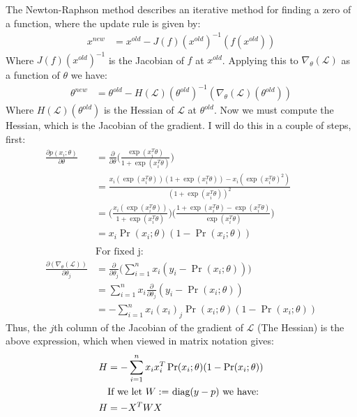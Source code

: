 \documentclass[12pt]{article}
\begin{document}
The Newton-Raphson method describes an iterative method for finding a zero
of a function, where the update rule is given by:
\begin{align*}
    x^{new} &= x^{old} - J(f)(x^{old})^{-1}(f(x^{old}))
\end{align*}
Where $J(f)(x^{old})^{-1}$ is the Jacobian of $f$ at $x^{old}$. Applying
this to $\nabla_\theta(\mathcal{L})$ as a function of $\theta$ we have:
\begin{align*}
    \theta^{new} &= \theta^{old} - H(\mathcal{L})(\theta^{old})^{-1}(\nabla_\theta(\mathcal{L})(\theta^{old}))
\end{align*}
Where $H(\mathcal{L})(\theta^{old})$ is the Hessian of $\mathcal{L}$ at $\theta^{old}$. Now we must compute the Hessian, which is the Jacobian of the gradient.
I will do this in a couple of steps, first:
\begin{align*}
    \frac{\partial p(x_i; \theta)}{\partial \theta} &= \frac{\partial}{\partial \theta}\Big(\frac{\exp(x_i^T\theta)}{1 + \exp(x_i^T\theta)}\Big) \\
    &= \frac{x_i(\exp(x_i^T\theta))(1 + \exp(x_i^T\theta)) - x_i(\exp(x_i^T\theta)^2)}{(1 + \exp(x_i^T\theta))^2} \\
    &= \Big(\frac{x_i(\exp(x_i^T\theta))}{1 + \exp(x_i^T\theta)}\Big)\Big(\frac{1 + \exp(x_i^T\theta) - \exp(x_i^T\theta)}{\exp(x_i^T\theta)} \Big) \\
    &= x_i\Pr(x_i; \theta)(1 - \Pr(x_i; \theta))
    \\ \\
    &\text{For fixed j:} \\
    \frac{\partial (\nabla_\theta(\mathcal{L}))}{\partial \theta_j} &= \frac{\partial}{\partial \theta_j}\Big(\displaystyle \sum_{i = 1}^{n} x_i(y_i - \Pr(x_i; \theta))\Big) \\
    &=\displaystyle \sum_{i = 1}^{n} x_i \frac{\partial}{\partial \theta_j}(y_i - \Pr(x_i; \theta)) \\
    &= \displaystyle -\sum_{i = 1}^{n} x_i(x_i)_j\Pr(x_i; \theta)(1 - \Pr(x_i; \theta))
\end{align*}
Thus, the $j$th column of the Jacobian of the gradient of $\mathcal{L}$ (The Hessian) is the above expression, which when viewed in matrix notation gives:
\begin{align*}
    H &= \displaystyle -\sum_{i = 1}^{n} x_ix_i^T\Pr(x_i; \theta)(1 - \Pr(x_i; \theta)) \\
    &\text{If we let $W :=$ \text{diag}$(y-p)$ we have:} \\
        H &= \displaystyle -X^TWX \\
\end{align*}
\end{document}
